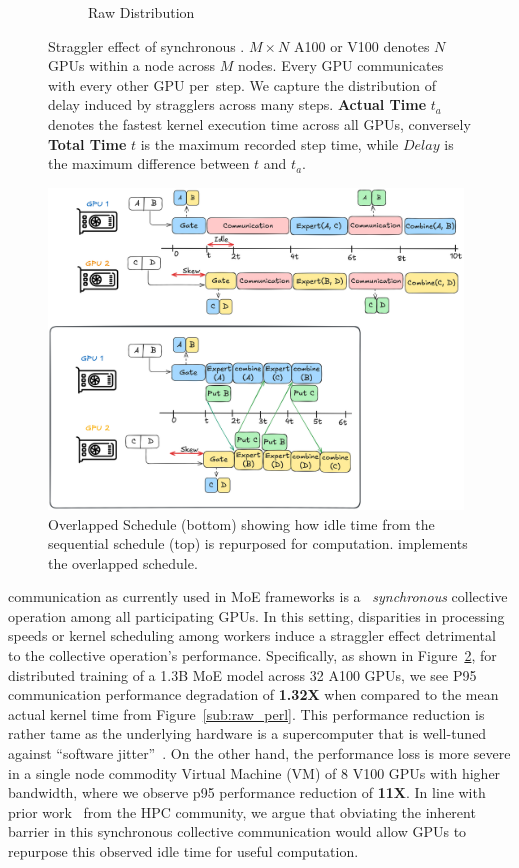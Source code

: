 \begin{figure}[!ht]
\begin{subfigure}{0.49\textwidth}
        \caption{Raw Distribution}
        \label{sub:raw_az}
    \end{subfigure}
    \caption{Straggler effect of synchronous \alltoall. $M\times N$ A100 or V100 denotes
        $N$ GPUs within a node across $M$ nodes.
        Every GPU communicates with every other GPU per~\alltoall step.
        We capture the distribution of delay induced by stragglers across many steps.
        \textbf{Actual Time} $t_a$ denotes the fastest kernel execution time across all GPUs,
        conversely \textbf{Total Time} $t$ is the maximum recorded step time, while
        $Delay$ is the maximum difference between $t$ and $t_a$.}
    \label{fig:straggler}
\end{figure}
\begin{figure}[!ht]
    \centering
    \includegraphics[width=0.98\textwidth, keepaspectratio]{figures/s_overlap}
    \caption{Overlapped Schedule (bottom) showing how idle time from the sequential schedule (top)
        is repurposed for computation. \sysname implements the overlapped schedule.}
    \label{fig:overlap}
\end{figure}
\alltoall communication as currently used in MoE frameworks is a ~\emph{synchronous} collective operation among
all participating GPUs. In this setting, disparities in processing speeds or kernel scheduling
among workers induce a straggler effect detrimental to the collective operation's performance.
Specifically, as shown in Figure~\ref{fig:straggler}, for distributed training of a 1.3B MoE model across 32 A100 GPUs,
we see P95 communication performance degradation of \textbf{1.32X} when compared to the mean actual kernel time
from Figure~\ref{sub:raw_perl}.
This performance reduction is rather tame as the underlying hardware is a supercomputer that is
well-tuned against ``software jitter''~\cite{nerscNetworkNERSC}.
On the other hand, the performance loss is more severe in a single node commodity Virtual Machine (VM) of
8 V100 GPUs with higher bandwidth, where we observe p95 performance reduction of \textbf{11X}.
In line with prior work~\cite{1639320, 10.1145/3545008.3545056} from the HPC community,
we argue that obviating the inherent barrier in this synchronous collective communication would
allow GPUs to repurpose this observed idle time for useful computation.
